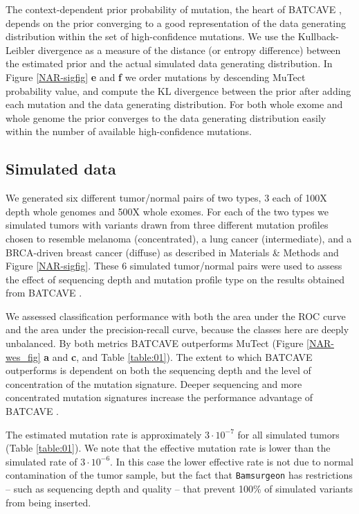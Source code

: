 \documentclass[a4,center,fleqn]{NAR}
\newcommand{\batcave}{BATCAVE }
\begin{document}
The context-dependent prior probability of mutation, the heart of \batcave, depends on the prior converging to a good representation of the data generating distribution within the set of high-confidence mutations.
We use the Kullback-Leibler divergence as a measure of the distance (or entropy difference) between the estimated prior and the actual simulated data generating distribution.
In Figure \ref{NAR-sigfig} \textbf{e} and \textbf{f} we order mutations by descending MuTect probability value, and compute the KL divergence between the prior after adding each mutation and the data generating distribution.
For both whole exome and whole genome the prior converges to the data generating distribution easily within the number of available high-confidence mutations. 

\subsection{Simulated data}
We generated six different tumor/normal pairs of two types, 3 each of 100X depth whole genomes and 500X whole exomes.
For each of the two types we simulated tumors with variants drawn from three different mutation profiles chosen to resemble melanoma (concentrated), a lung cancer (intermediate), and a BRCA-driven breast cancer (diffuse)  as described in Materials \& Methods and Figure \ref{NAR-sigfig}.
These 6 simulated tumor/normal pairs were used to assess the effect of sequencing depth and mutation profile type on the results obtained from \batcave.


We assessed classification performance with both the area under the ROC curve and the area under the precision-recall curve, because the classes here are deeply unbalanced.
By both metrics \batcave outperforms MuTect (Figure \ref{NAR-wes_fig} \textbf{a} and \textbf{c}, and Table \ref{table:01}).
The extent to which \batcave outperforms is dependent on both the sequencing depth and the level of concentration of the mutation signature.
Deeper sequencing and more concentrated mutation signatures increase the performance advantage of \batcave. 

The estimated mutation rate is approximately $3\cdot10^{-7}$ for all simulated tumors (Table \ref{table:01}).
We note that the effective mutation rate is lower than the simulated rate of $3\cdot10^{-6}$.
In this case the lower effective rate is not due to normal contamination of the tumor sample, but the fact that \texttt{Bamsurgeon} has restrictions -- such as sequencing depth and quality -- that prevent 100\% of simulated variants from being inserted. 
\end{document}
